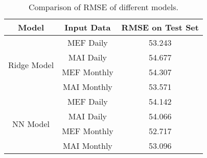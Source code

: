 \begin{table}[H]
  \centering
  \begin{tabular}{|c|c|c|}
  \hline
  \textbf{Model} & \textbf{Input Data} & \textbf{RMSE on Test Set} \\ \hline
  \multirow{4}{*}{Ridge Model} & MEF Daily & 53.243 \\ \cline{2-3} 
   & MAI Daily & 54.677 \\ \cline{2-3} 
   & MEF Monthly & 54.307 \\ \cline{2-3} 
   & MAI Monthly & 53.571 \\ \hline
  \multirow{4}{*}{NN Model} & MEF Daily & 54.142 \\ \cline{2-3} 
   & MAI Daily & 54.066 \\ \cline{2-3} 
   & MEF Monthly & 52.717 \\ \cline{2-3} 
   & MAI Monthly & 53.096 \\ \hline
  \end{tabular}
  \caption{Comparison of RMSE of different models.}
  \label{tab:RMSE}
  \end{table}